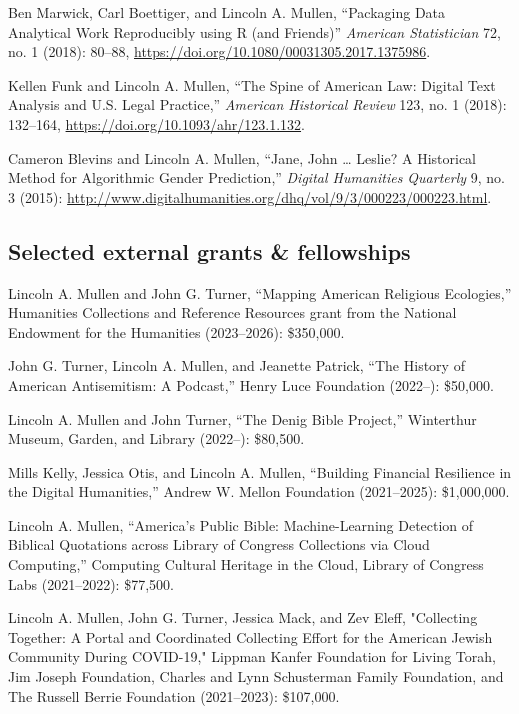 \documentclass[11pt]{article}
\begin{document}
Ben Marwick, Carl Boettiger, and Lincoln A. Mullen, ``Packaging Data Analytical Work Reproducibly using R (and Friends)'' \emph{American Statistician} 72, no. 1 (2018): 80--88, \url{https://doi.org/10.1080/00031305.2017.1375986}.

Kellen Funk and Lincoln A. Mullen, ``The Spine of American Law: Digital Text Analysis and U.S. Legal Practice,'' \emph{American Historical Review} 123, no.  1 (2018): 132--164, \url{https://doi.org/10.1093/ahr/123.1.132}.

Cameron Blevins and Lincoln A. Mullen, ``Jane, John \ldots{} Leslie? A Historical Method for Algorithmic Gender Prediction,'' \emph{Digital Humanities Quarterly} 9, no. 3 (2015): \url{http://www.digitalhumanities.org/dhq/vol/9/3/000223/000223.html}. 


\subsection{Selected external grants \& fellowships}\label{grants-and-fellowships}

Lincoln A. Mullen and John G. Turner, ``Mapping American Religious Ecologies,'' Humanities Collections and Reference Resources grant from the National Endowment for the Humanities (2023--2026): \$350,000.

John G. Turner, Lincoln A. Mullen, and Jeanette Patrick, ``The History of American Antisemitism: A Podcast,'' Henry Luce Foundation (2022--): \$50,000.

Lincoln A. Mullen and John Turner, ``The Denig Bible Project,'' Winterthur Museum, Garden, and Library (2022--): \$80,500.

Mills Kelly, Jessica Otis, and Lincoln A. Mullen, ``Building Financial Resilience in the Digital Humanities,'' Andrew W. Mellon Foundation (2021--2025): \$1,000,000.

Lincoln A. Mullen, ``America's Public Bible: Machine-Learning Detection of Biblical Quotations across Library of Congress Collections via Cloud Computing,'' Computing Cultural Heritage in the Cloud, Library of Congress Labs (2021--2022): \$77,500.

Lincoln A. Mullen, John G. Turner, Jessica Mack, and Zev Eleff, "Collecting Together: A Portal and Coordinated Collecting Effort for the American Jewish Community During COVID-19," Lippman Kanfer Foundation for Living Torah, Jim Joseph Foundation, Charles and Lynn Schusterman Family Foundation, and The Russell Berrie Foundation (2021--2023): \$107,000.
\end{document}
